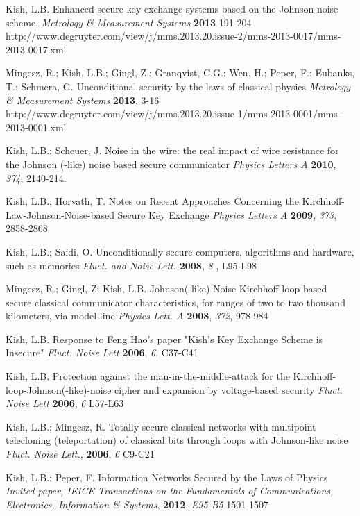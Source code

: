 \documentclass{ws-fnl2}
\begin{document}
\begin{thebibliography}{99}
Kish, L.B. Enhanced secure key exchange systems based on the Johnson-noise scheme. {\em Metrology \& Measurement Systems} {\bf 2013} 191-204 http://www.degruyter.com/view/j/mms.2013.20.issue-2/mms-2013-0017/mms-2013-0017.xml

Mingesz, R.; Kish, L.B.; Gingl, Z.; Granqvist, C.G.; Wen, H.; Peper, F.; Eubanks, T.; Schmera, G. Unconditional security by the laws of classical physics {\em Metrology \& Measurement Systems} {\bf 2013}, 3-16 http://www.degruyter.com/view/j/mms.2013.20.issue-1/mms-2013-0001/mms-2013-0001.xml

Kish, L.B.; Scheuer, J. Noise in the wire: the real impact of wire resistance for the Johnson (-like) noise based secure communicator {\em Physics Letters A} {\bf 2010}, {\em 374}, 2140-214.

Kish, L.B.; Horvath, T. Notes on Recent Approaches Concerning the Kirchhoff-Law-Johnson-Noise-based Secure Key Exchange {\em Physics Letters A} {\bf 2009}, {\em 373}, 2858-2868

Kish, L.B.; Saidi, O. Unconditionally secure computers, algorithms and hardware, such as memories {\em Fluct. and Noise Lett.} {\bf 2008}, {\em 8 }, L95-L98 

Mingesz, R.; Gingl, Z; Kish, L.B. Johnson(-like)-Noise-Kirchhoff-loop based secure classical communicator characteristics, for ranges of two to two thousand kilometers, via model-line {\em Physics Lett. A} {\bf 2008}, {\em 372}, 978-984

Kish, L.B. Response to Feng Hao's paper "Kish's Key Exchange Scheme is Insecure" {\em Fluct. Noise Lett} {\bf 2006}, {\em 6}, C37-C41

Kish, L.B. Protection against the man-in-the-middle-attack for the Kirchhoff-loop-Johnson(-like)-noise cipher and expansion by voltage-based security {\em Fluct. Noise Lett} {\bf 2006}, {\em 6} L57-L63

Kish, L.B.; Mingesz, R. Totally secure classical networks with multipoint telecloning (teleportation) of classical bits through loops with Johnson-like noise {\em Fluct. Noise Lett.}, {\bf 2006}, {\em 6} C9-C21

Kish, L.B.; Peper, F. Information Networks Secured by the Laws of Physics {\em Invited paper, IEICE Transactions on the Fundamentals of Communications, Electronics, Information \& Systems}, {\bf 2012}, {\em E95-B5} 1501-1507


\end{thebibliography}
\end{document}
